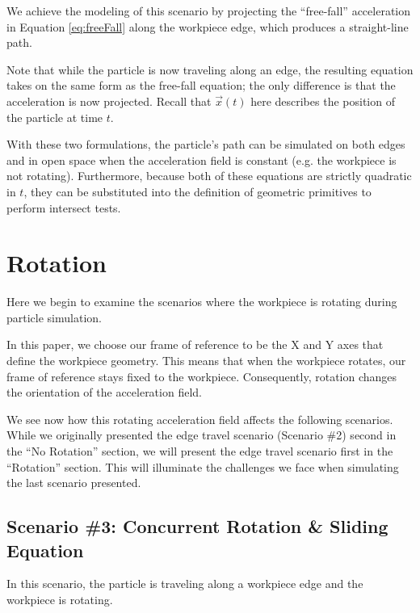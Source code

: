 We achieve the modeling of this scenario by projecting the ``free-fall'' acceleration in Equation \eqref{eq:freeFall} along the workpiece edge, which produces a straight-line path.

Note that while the particle is now traveling along an edge, the resulting equation takes on the same form as the free-fall equation; the only difference is that the acceleration is now projected. Recall that $\vec{x}(t)$ here describes the position of the particle at time $t$.



With these two formulations, the particle's path can be simulated on both edges and in open space when the acceleration field is constant (e.g. the workpiece is not rotating). Furthermore, because both of these equations are strictly quadratic in $t$, they can be substituted into the definition of geometric primitives to perform intersect tests.

\section{Rotation}

Here we begin to examine the scenarios where the workpiece is rotating during particle simulation.

In this paper, we choose our frame of reference to be the X and Y axes that define the workpiece geometry. This means that when the workpiece rotates, our frame of reference stays fixed to the workpiece. Consequently, rotation changes the orientation of the acceleration field.

We see now how this rotating acceleration field affects the following scenarios. While we originally presented the edge travel scenario (Scenario \#2) second in the ``No Rotation'' section, we will present the edge travel scenario first in the ``Rotation'' section. This will illuminate the challenges we face when simulating the last scenario presented.

		\subsection{Scenario \#3: Concurrent Rotation \& Sliding Equation}

In this scenario, the particle is traveling along a workpiece edge and the workpiece is rotating.

